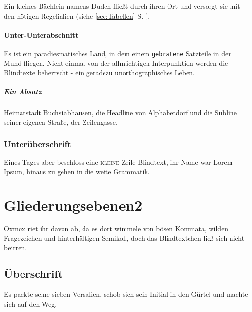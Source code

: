 \documentclass[%
	12pt,%
	a4paper,%
	oneside,%
	listof=totoc,
 	index=totoc,
	bibliography = totoc,
	parskip = half,%
	chapterprefix=false,%
	appendixprefix, %
headings=small,%
]{scrreprt}
\begin{document}
Ein kleines Bächlein namens Duden fließt durch ihren Ort und versorgt sie mit den nötigen Regelialien (siehe \ref{sec:Tabellen} S. \pageref{sec:Tabellen}).

\subsubsection{Unter-Unterabschnitt}

Es ist ein paradiesmatisches Land, in dem einem \texttt{gebratene} Satzteile in den Mund fliegen. Nicht einmal von der allmächtigen Interpunktion werden die Blindtexte beherrscht - ein geradezu unorthographisches Leben. 

\paragraph{Ein Absatz}
Heimatstadt Buchstabhausen, die Headline von Alphabetdorf und die Subline seiner eigenen Straße, der Zeilengasse.

\subsection{Unterüberschrift}

Eines Tages aber beschloss eine \textsc{kleine} Zeile Blindtext, ihr Name war Lorem Ipsum, hinaus zu gehen in die weite Grammatik.

\chapter{Gliederungsebenen2}
\label{sec:Gliederung2}

Oxmox riet ihr davon ab, da es dort wimmele von bösen Kommata, wilden Fragezeichen und hinterhältigen Semikoli, doch das Blindtextchen ließ sich nicht beirren. 

\section{Überschrift}

Es packte seine sieben Versalien, schob sich sein Initial in den Gürtel und machte sich auf den Weg. 
\end{document}
